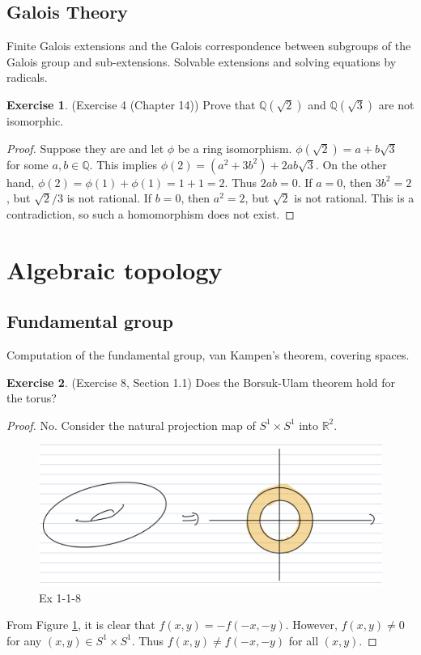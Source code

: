\documentclass[12pt, psamsfonts]{amsart}
\theoremstyle{definition}
\newtheorem*{exer}{Exercise}
\theoremstyle{remark}
\numberwithin{equation}{section}
\begin{document}
\subsection{Galois Theory}
Finite Galois extensions and the Galois correspondence between subgroups of the Galois group and sub-extensions.
Solvable extensions and solving equations by radicals.

\begin{exer}{(Exercise 4 (Chapter 14))}
  Prove that $\mathbb{Q}(\sqrt{2})$ and $\mathbb{Q}(\sqrt{3})$ are not isomorphic.
\end{exer}

\begin{proof}
  Suppose they are and let $\phi$ be a ring isomorphism.
  $\phi(\sqrt{2}) = a + b\sqrt{3}$ for some $a, b \in \mathbb{Q}$.
  This implies $\phi(2) = (a^2 + 3b^2) + 2ab\sqrt{3}$.
  On the other hand, $\phi(2) = \phi(1) + \phi(1) = 1 + 1 = 2$.
  Thus $2ab = 0$.
  If $a = 0$, then $3b^2 = 2$, but $\sqrt{2}/3$ is not rational.
  If $b = 0$, then $a^2 = 2$, but $\sqrt{2}$ is not rational.
  This is a contradiction, so such a homomorphism does not exist.
\end{proof}

\section{Algebraic topology}

\subsection{Fundamental group}
Computation of the fundamental group, van Kampen's theorem, covering spaces.

\begin{exer}{(Exercise 8, Section 1.1)}
  Does the Borsuk-Ulam theorem hold for the torus?
\end{exer}

\begin{proof}
  No.
  Consider the natural projection map of $S^1 \times S^1$ into $\mathbb{R}^2$.
  \begin{figure}[!htb]
    \includegraphics[width=.5\linewidth]{img/hatcher/ex-1-1-8.jpeg}
      \caption{Ex 1-1-8}
    \label{fig:ex_1_1_8}
  \end{figure}
  From Figure \ref{fig:ex_1_1_8}, it is clear that $f(x, y) = -f(-x, -y)$.
  However, $f(x, y) \ne 0$ for any $(x, y) \in S^1 \times S^1$.
  Thus $f(x, y) \ne f(-x, -y)$ for all $(x, y)$.
\end{proof}
\end{document}
